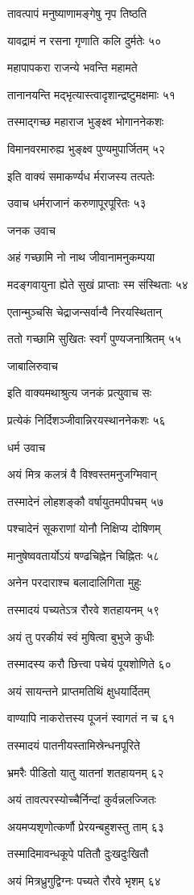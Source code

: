 तावत्पापं मनुष्याणामङ्गेषु नृप तिष्ठति

यावद्रामं न रसना गृणाति कलि दुर्मतेः ५०

महापापकरा राजन्ये भवन्ति महामते

तानानयन्ति मद्भृत्यास्त्वादृशान्द्रष्टुमक्षमाः ५१

तस्माद्गच्छ महाराज भुङ्क्ष्व भोगाननेकशः

विमानवरमारुह्य भुङ्क्ष्व पुण्यमुपार्जितम् ५२

इति वाक्यं समाकर्ण्यध र्मराजस्य तत्पतेः

उवाच धर्मराजानं करुणापूरपूरितः ५३

जनक उवाच

अहं गच्छामि नो नाथ जीवानामनुकम्पया

मदङ्गवायुना ह्येते सुखं प्राप्ताः स्म संस्थिताः ५४

एतान्मुञ्चसि चेद्राजन्सर्वान्वै निरयस्थितान्

ततो गच्छामि सुखितः स्वर्गं पुण्यजनाश्रितम् ५५

जाबालिरुवाच

इति वाक्यमथाश्रुत्य जनकं प्रत्युवाच सः

प्रत्येकं निर्दिशञ्जीवान्निरयस्थाननेकशः ५६

धर्म उवाच

अयं मित्र कलत्रं वै विश्वस्तमनुजग्मिवान्

तस्मादेनं लोहशङ्कौ वर्षायुतमपीपचम् ५७

पश्चादेनं सूकराणां योनौ निक्षिप्य दोषिणम्

मानुषेष्ववतार्योऽयं षण्ढचिह्नेन चिह्नितः ५८

अनेन परदाराश्च बलादालिगिता मुहुः

तस्मादयं पच्यतेऽत्र रौरवे शतहायनम् ५९

अयं तु परकीयं स्वं मुषित्वा बुभुजे कुधीः

तस्मादस्य करौ छित्त्वा पचेयं पूयशोणिते ६०

अयं सायन्तने प्राप्तमतिथिं क्षुधयार्दितम्

वाण्यापि नाकरोत्तस्य पूजनं स्वागतं न च ६१

तस्मादयं पातनीयस्तामिस्रेन्धनपूरिते

भ्रमरैः पीडितो यातु यातनां शतहायनम् ६२

अयं तावत्परस्योच्चैर्निन्दां कुर्वन्नलज्जितः

अयमप्यशृणोत्कर्णौ प्रेरयन्बहुशस्तु ताम् ६३

तस्मादिमावन्धकूपे पतितौ दुःखदुःखितौ

अयं मित्रध्रुगुद्विग्नः पच्यते रौरवे भृशम् ६४


